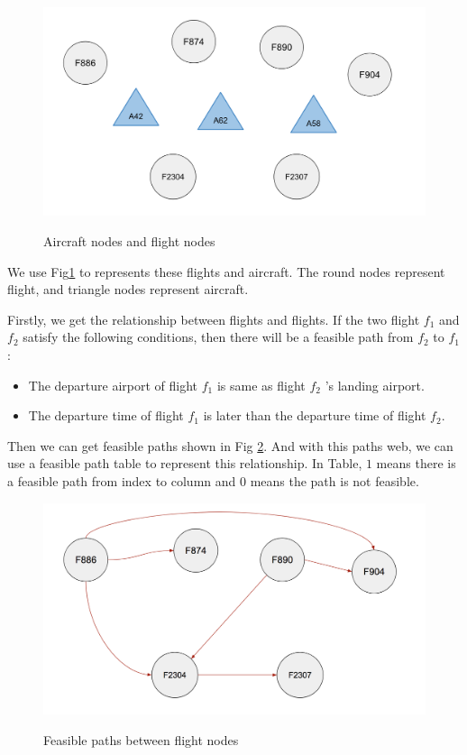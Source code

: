 \documentclass[senior]{IPSstyle}
\begin{document}
\begin{figure}
    \centering
    \includegraphics[width=15cm]{MasterThesis-master/nodes.png}\\
    \caption{Aircraft nodes and flight nodes}
    \label{fig:nodes}
\end{figure}
We use Fig\ref{fig:nodes} to represents these flights and aircraft. The round nodes represent flight, and triangle nodes represent aircraft.

Firstly, we get the relationship between flights and flights. If the two flight \(f_1\) and \(f_2\) satisfy the following conditions, then there will be a feasible path from \(f_2\) to \(f_1\):
\begin{itemize}
    \item The departure airport of flight \(f_1\) is same as flight \(f_2\) 's landing airport.
    \item The departure time of flight \(f_1\) is later than the departure time of flight \(f_2\).
\end{itemize}
Then we can get feasible paths shown in Fig \ref{fig:f2f}. And with this paths web, we can use a feasible path table to represent this relationship. In Table, \(1\) means there is a feasible path from index to column and \(0\) means the path is not feasible. 
\begin{figure}[h]
    \centering
    \includegraphics[width=15cm]{MasterThesis-master/f2f.png}\\
    \caption{Feasible paths between flight nodes}
    \label{fig:f2f}
\end{figure}
\end{document}

